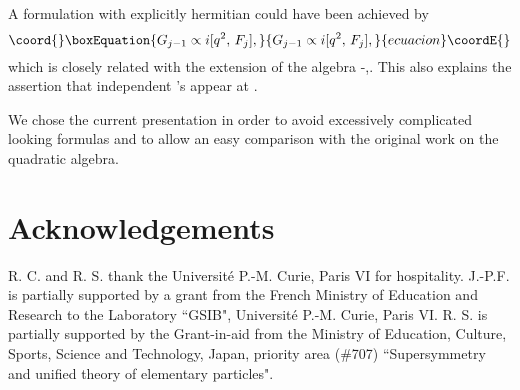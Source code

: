 \documentclass[a4paper,12pt]{article}
\begin{document}
A formulation with  explicitly hermitian \coordHE{} could have been achieved by
\begin{equation}\coord{}\boxEquation{
G_{j-1}\propto i[q^2,\,F_j],
}{
G_{j-1}\propto i[q^2,\,F_j],
}{ecuacion}\coordE{}\end{equation}
which is closely related with the extension of the \coordHE{} algebra
\cite{Pere1}-\cite{Br},\cite{UjWa,Heck,Gonera1}. This also explains the
assertion that independent \coordHE{}'s appear at \coordHE{}.

We chose the current presentation in order to avoid excessively
complicated looking formulas and to allow
an easy comparison with the original work \cite{Kuz} on the quadratic
algebra.

\section*{Acknowledgements}
\setcounter{equation}{0}
R. C. and R. S. thank the Universit\'e P.-M. Curie, Paris VI
for hospitality.
        J.-P.F. is partially supported by a grant from the
French Ministry of Education and Research to the Laboratory
``GSIB", Universit\'e P.-M. Curie, Paris VI.
        R. S. is partially supported  by the Grant-in-aid from the
Ministry of Education, Culture, Sports, Science and Technology, Japan,
priority area (\#707) ``Supersymmetry and unified theory of elementary
particles".
\end{document}

